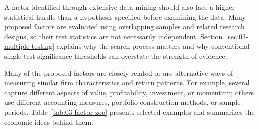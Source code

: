 A factor identified through extensive data mining should also face a higher statistical hurdle than a hypothesis specified before examining the data. Many proposed factors are evaluated using overlapping samples and related research designs, so their test statistics are not necessarily independent. Section~\ref{sec:03-multiple-testing} explains why the search process matters and why conventional single-test significance thresholds can overstate the strength of evidence.

Many of the proposed factors are closely related or are alternative ways of measuring similar firm characteristics and return patterns. For example, several capture different aspects of value, profitability, investment, or momentum; others use different accounting measures, portfolio-construction methods, or sample periods. Table~\ref{tab:03-factor-zoo} presents selected examples and summarizes the economic ideas behind them.

